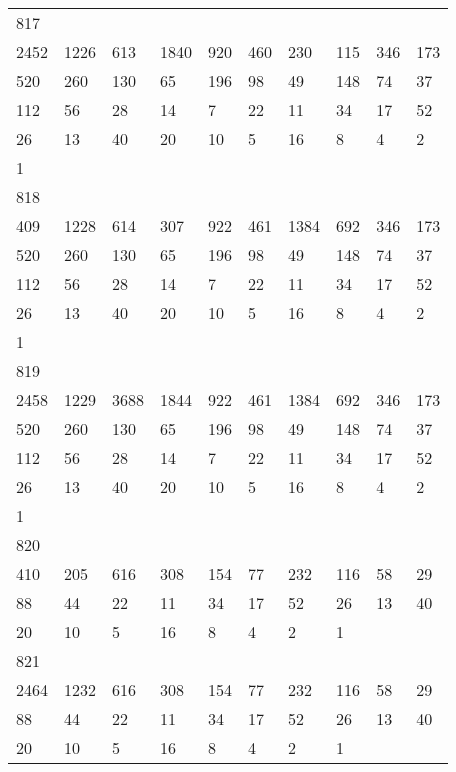 \begin{longtable}{*{10}{l}}
817&&&&&&&&&\\
2452& 1226& 613& 1840& 920& 460& 230& 115& 346& 173\\
520& 260& 130& 65& 196& 98& 49& 148& 74& 37\\
112& 56& 28& 14& 7& 22& 11& 34& 17& 52\\
26& 13& 40& 20& 10& 5& 16& 8& 4& 2\\
1& \\

818&&&&&&&&&\\
409& 1228& 614& 307& 922& 461& 1384& 692& 346& 173\\
520& 260& 130& 65& 196& 98& 49& 148& 74& 37\\
112& 56& 28& 14& 7& 22& 11& 34& 17& 52\\
26& 13& 40& 20& 10& 5& 16& 8& 4& 2\\
1& \\

819&&&&&&&&&\\
2458& 1229& 3688& 1844& 922& 461& 1384& 692& 346& 173\\
520& 260& 130& 65& 196& 98& 49& 148& 74& 37\\
112& 56& 28& 14& 7& 22& 11& 34& 17& 52\\
26& 13& 40& 20& 10& 5& 16& 8& 4& 2\\
1& \\

820&&&&&&&&&\\
410& 205& 616& 308& 154& 77& 232& 116& 58& 29\\
88& 44& 22& 11& 34& 17& 52& 26& 13& 40\\
20& 10& 5& 16& 8& 4& 2& 1& \\

821&&&&&&&&&\\
2464& 1232& 616& 308& 154& 77& 232& 116& 58& 29\\
88& 44& 22& 11& 34& 17& 52& 26& 13& 40\\
20& 10& 5& 16& 8& 4& 2& 1& \\


\end{longtable}
